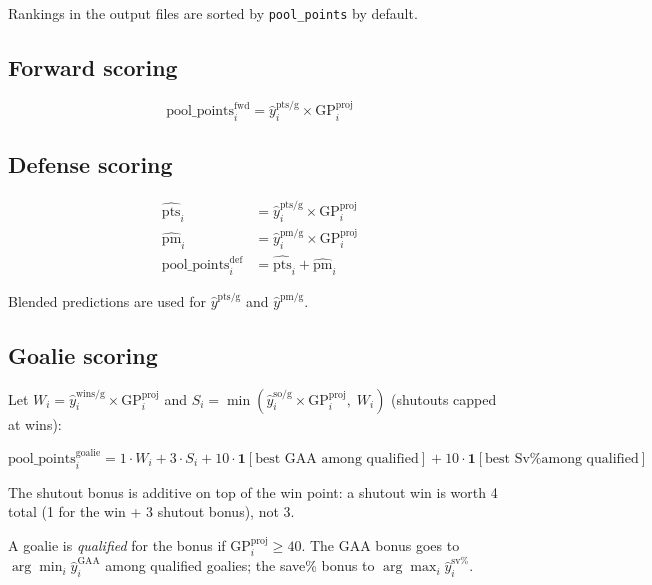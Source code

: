 \documentclass[11pt, a4paper]{article}
\begin{document}
Rankings in the output files are sorted by \texttt{pool\_points} by default.

\subsection{Forward scoring}

\begin{equation}
  \text{pool\_points}_i^{\text{fwd}} = \hat{y}_i^{\text{pts/g}} \times \text{GP}_i^{\text{proj}}
\end{equation}

\subsection{Defense scoring}

\begin{align}
  \widehat{\text{pts}}_i &= \hat{y}_i^{\text{pts/g}} \times \text{GP}_i^{\text{proj}} \\
  \widehat{\text{pm}}_i  &= \hat{y}_i^{\text{pm/g}} \times \text{GP}_i^{\text{proj}} \\
  \text{pool\_points}_i^{\text{def}} &= \widehat{\text{pts}}_i + \widehat{\text{pm}}_i
\end{align}

Blended predictions are used for $\hat{y}^{\text{pts/g}}$ and $\hat{y}^{\text{pm/g}}$.

\subsection{Goalie scoring}

Let $W_i = \hat{y}_i^{\text{wins/g}} \times \text{GP}_i^{\text{proj}}$ and
$S_i = \min(\hat{y}_i^{\text{so/g}} \times \text{GP}_i^{\text{proj}},\; W_i)$
(shutouts capped at wins):

\begin{equation}
  \text{pool\_points}_i^{\text{goalie}} = 1 \cdot W_i + 3 \cdot S_i
    + 10 \cdot \mathbf{1}[\text{best GAA among qualified}]
    + 10 \cdot \mathbf{1}[\text{best Sv\% among qualified}]
\end{equation}

The shutout bonus is additive on top of the win point: a shutout win is worth 4 total
(1 for the win + 3 shutout bonus), not 3.

A goalie is \emph{qualified} for the bonus if $\text{GP}_i^{\text{proj}} \geq 40$.
The GAA bonus goes to $\arg\min_i \hat{y}_i^{\text{GAA}}$ among qualified goalies;
the save\% bonus to $\arg\max_i \hat{y}_i^{\text{sv\%}}$.
\end{document}
